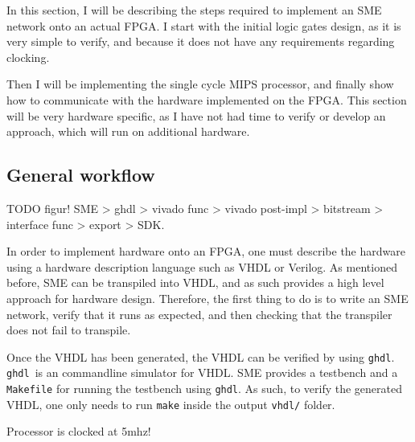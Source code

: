 In this section, I will be describing the steps required to implement an SME
network onto an actual FPGA. I start with the initial logic gates design, as it
is very simple to verify, and because it does not have any requirements
regarding clocking.

Then I will be implementing the single cycle MIPS processor, and finally show
how to communicate with the hardware implemented on the FPGA. This section will
be very hardware specific, as I have not had time to verify or develop an
approach, which will run on additional hardware.

\subsection{General workflow}
TODO figur! SME > ghdl > vivado func > vivado post-impl > bitstream > interface func >
export > SDK.

In order to implement hardware onto an FPGA, one must describe the hardware
using a hardware description language such as VHDL or Verilog. As mentioned
before, SME can be transpiled into VHDL, and as such provides a high level
approach for hardware design. Therefore, the first thing to do is to write an
SME network, verify that it runs as expected, and then checking that the
transpiler does not fail to transpile.

Once the VHDL has been generated, the VHDL can be verified by using
\texttt{ghdl}. \texttt{ghdl} is an commandline simulator for VHDL. SME provides
a testbench and a \texttt{Makefile} for running the testbench using
\texttt{ghdl}. As such, to verify the generated VHDL, one only needs to run
\texttt{make} inside the output \texttt{vhdl/} folder.

Processor is clocked at 5mhz!
